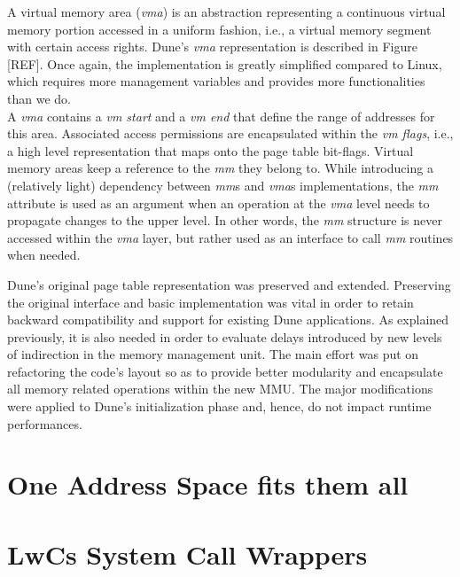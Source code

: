 A virtual memory area (\emph{vma}) is an abstraction representing a continuous virtual memory portion accessed in a uniform fashion, i.e., a virtual memory segment with certain access rights.
Dune's \emph{vma} representation is described in Figure [REF].
Once again, the implementation is greatly simplified compared to Linux, which requires more management variables and provides more functionalities than we do.\\
A \emph{vma} contains a \emph{vm start} and a \emph{vm end} that define the range of addresses for this area.
Associated access permissions are encapsulated within the \emph{vm flags}, i.e., a high level representation that maps onto the page table bit-flags.
Virtual memory areas keep a reference to the \emph{mm} they belong to.
While introducing a (relatively light) dependency between \emph{mm}s and \emph{vma}s implementations, the \emph{mm} attribute is used as an argument when an operation at the \emph{vma} level needs to propagate changes to the upper level.
In other words, the \emph{mm} structure is never accessed within the \emph{vma} layer, but rather used as an interface to call \emph{mm} routines when needed.

Dune's original page table representation was preserved and extended.
Preserving the original interface and basic implementation was vital in order to retain backward compatibility and support for existing Dune applications.
As explained previously, it is also needed in order to evaluate delays introduced by new levels of indirection in the memory management unit.
The main effort was put on refactoring the code's layout so as to provide better modularity and encapsulate all memory related operations within the new MMU.
The major modifications were applied to Dune's initialization phase and, hence, do not impact runtime performances.

\section{One Address Space fits them all}

\section{LwCs System Call Wrappers}
